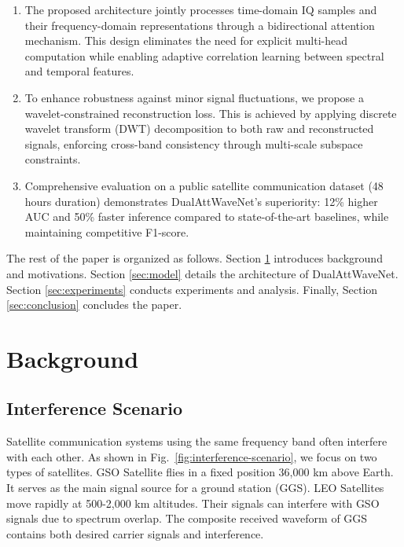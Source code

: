 \documentclass[conference]{IEEEtran}
\begin{document}
\begin{enumerate}
    \item The proposed architecture jointly processes time-domain IQ samples and their frequency-domain representations through a bidirectional attention mechanism. This design eliminates the need for explicit multi-head computation while enabling adaptive correlation learning between spectral and temporal features.
    \item To enhance robustness against minor signal fluctuations, we propose a wavelet-constrained reconstruction loss. This is achieved by applying discrete wavelet transform (DWT) decomposition to both raw and reconstructed signals, enforcing cross-band consistency through multi-scale subspace constraints.
    \item Comprehensive evaluation on a public satellite communication dataset (48 hours duration) demonstrates DualAttWaveNet's superiority: 12\% higher AUC and 50\% faster inference compared to state-of-the-art baselines, while maintaining competitive F1-score.
\end{enumerate}

The rest of the paper is organized as follows. Section \ref{sec:background} introduces background and motivations. Section \ref{sec:model} details the architecture of DualAttWaveNet. Section \ref{sec:experiments} conducts experiments and analysis. Finally, Section \ref{sec:conclusion} concludes the paper.

\section{Background}
\label{sec:background}

\subsection{Interference Scenario}

Satellite communication systems using the same frequency band often interfere with each other. As shown in Fig.~\ref{fig:interference-scenario}, we focus on two types of satellites. GSO Satellite flies in a fixed position 36,000 km above Earth. It serves as the main signal source for a ground station (GGS). LEO Satellites move rapidly at 500-2,000 km altitudes. Their signals can interfere with GSO signals due to spectrum overlap. The composite received waveform of GGS contains both desired carrier signals and interference.
\end{document}
